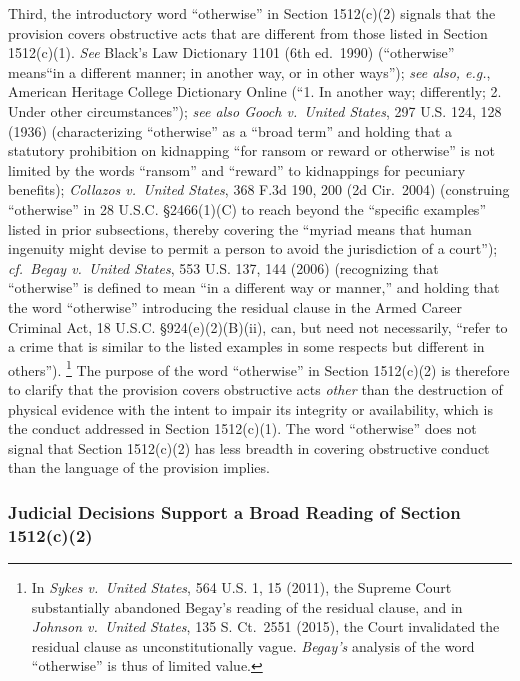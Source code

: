 Third, the introductory word “otherwise” in Section 1512(c)(2) signals that the provision covers obstructive acts that are different from those listed in Section 1512(c)(1).
\textit{See} Black’s Law Dictionary 1101 (6th ed.~1990) (“otherwise” means“in a different manner; in another way, or in other ways”);
\textit{see also, e.g.}, American Heritage College Dictionary Online (“1. In another way; differently; 2. Under other circumstances”);
\textit{see also Gooch v.\ United States}, 297 U.S. 124, 128 (1936) (characterizing “otherwise” as a “broad term” and holding that a statutory prohibition on kidnapping “for ransom or reward or otherwise” is not limited by the words “ransom” and “reward” to kidnappings for pecuniary benefits);
\textit{Collazos v.\ United States}, 368 F.3d 190, 200 (2d Cir.~2004) (construing “otherwise” in 28 U.S.C. \S 2466(1)(C) to reach beyond the “specific examples” listed in prior subsections, thereby covering the “myriad means that human ingenuity might devise to permit a person to avoid the jurisdiction of a court”);
\textit{cf.~Begay v.\ United States}, 553 U.S. 137, 144 (2006) (recognizing that “otherwise” is defined to mean “in a different way or manner,” and holding that the word “otherwise” introducing the residual clause in the Armed Career Criminal Act, 18 U.S.C. \S 924(e)(2)(B)(ii), can, but need not necessarily, “refer to a crime that is similar to the listed examples in some respects but different in others”).%
\footnote{In \textit{Sykes v.\ United States}, 564 U.S. 1, 15 (2011), the Supreme Court substantially abandoned Begay’s reading of the residual clause, and in \textit{Johnson v.\ United States}, 135 S. Ct.~2551 (2015), the Court invalidated the residual clause as unconstitutionally vague.
\textit{Begay’s} analysis of the word “otherwise” is thus of limited value.}
The purpose of the word “otherwise” in Section 1512(c)(2) is therefore to clarify that the provision covers obstructive acts \textit{other} than the destruction of physical evidence with the intent to impair its integrity or availability, which is the conduct addressed in Section 1512(c)(1).
The word “otherwise” does not signal that Section 1512(c)(2) has less breadth in covering obstructive conduct than the language of the provision implies.

\subsubsection{Judicial Decisions Support a Broad Reading of Section 1512(c)(2)}

